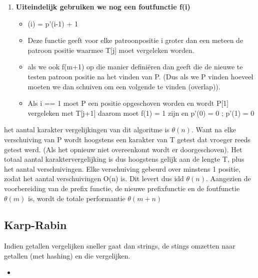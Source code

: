 \begin{enumerate}
\item \textbf{Uiteindelijk gebruiken we nog een foutfunctie f(i)}
\begin{itemize}
\item (i) = p'(i-1) + 1
\item Deze functie geeft voor elke patroonpositie i groter dan een meteen de patroon positie waarmee T[j] moet vergeleken worden.
\item als we ook f(m+1) op die manier defini\"eren dan geeft die de nieuwe te testen patroon positie na het vinden van P. (Dus als we P vinden hoeveel moeten we dan schuiven om een volgende te vinden (overlap)).
\item Als i == 1 moet P een positie opgeschoven worden en wordt P[1] vergeleken met T[j+1] daarom moet f(1) = 1 zijn en p'(0) = 0 ; p'(1)  = 0
\end{itemize}
\end{enumerate}

het aantal karakter vergelijkingen van dit algoritme is $\theta(n)$. Want na elke verschuiving van P wordt hoogstens een karakter van T getest dat vroeger reeds getest werd. (Als het opnieuw niet overeenkomt wordt er doorgeschoven). Het totaal aantal karaktervergelijking is dus hoogstens gelijk aan de lengte T, plus het aantal verschuivingen. Elke verschuiving gebeurd over minstens 1 positie, zodat het aantal verschuivingen O(n) is. Dit levert dus idd $\theta(n)$.
\npar
Aangezien de voorbereiding van de prefix functie, de nieuwe prefixfunctie en de foutfunctie $\theta(m)$ is, wordt de totale performantie $\theta(m+n)$

\subsection{Karp-Rabin}
Indien getallen vergelijken sneller gaat dan strings, de stings omzetten naar getallen (met hashing) en die vergelijken.
\begin{itemize}
\item 
\end{itemize}
